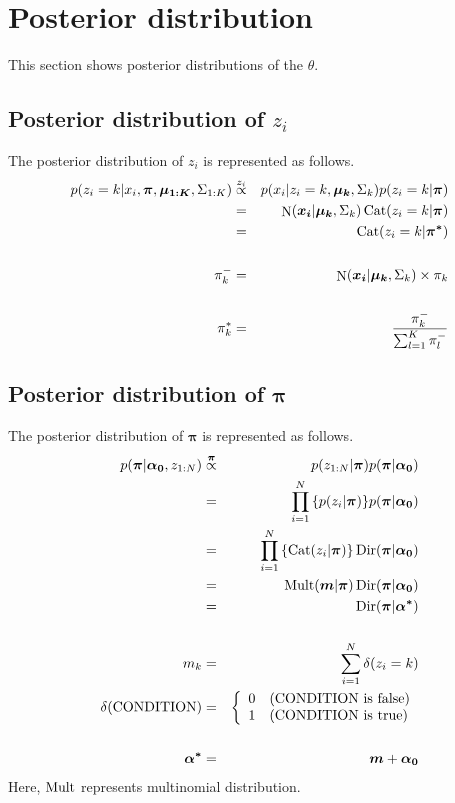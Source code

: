 \documentclass[a4paper]{article}
\DeclareMathOperator{\Cat}{\rm Cat}
\DeclareMathOperator{\Mult}{\rm Mult}
\DeclareMathOperator{\Dir}{\rm Dir}
\DeclareMathOperator{\N}{\rm N}
\newcommand{\proptoas}[1]{\overset{#1}{\propto}}
\begin{document}
\section{Posterior distribution}
This section shows posterior distributions of the $\theta$.

\subsection{Posterior distribution of $z_i$}
The posterior distribution of $z_i$ is represented as follows.
\begin{eqnarray}
	p(z_i = k | x_i, \boldsymbol{\pi}, \boldsymbol{\mu_{1:K}}, \Sigma_{1:K}) &\proptoas{z_i}& p(x_i | z_i = k, \boldsymbol{\mu_k}, \Sigma_k) p(z_i = k | \boldsymbol{\pi})\\
	&=& \N(\boldsymbol{x_i} | \boldsymbol{\mu_k}, \Sigma_k) \Cat(z_i = k | \boldsymbol{\pi})\\
	&=& \Cat(z_i = k | \boldsymbol{\pi^*})\\
	\nonumber \\
	\pi^{-}_{k} &=& \N(\boldsymbol{x_i} | \boldsymbol{\mu_k}, \Sigma_k) \times \pi_k \\
	\nonumber \\
	\pi^*_k &=& \frac{\pi^{-}_k}{\sum_{l = 1}^{K}{\pi^{-}_l}}
\end{eqnarray}

\subsection{Posterior distribution of $\boldsymbol{\pi}$}
The posterior distribution of $\boldsymbol{\pi}$ is represented as follows.
\begin{eqnarray}
	p(\boldsymbol{\pi} | \boldsymbol{\alpha_0}, z_{1:N}) &\proptoas{\boldsymbol{\pi}}& p(z_{1:N} | \boldsymbol{\pi}) p(\boldsymbol{\pi} | \boldsymbol{\alpha_0})\\
	&=& \prod_{i=1}^{N}{\left\{ p(z_i | \boldsymbol{\pi}) \right\} } p(\boldsymbol{\pi} | \boldsymbol{\alpha_0})\\
	&=& \prod_{i=1}^{N}{\left\{ \Cat(z_i | \boldsymbol{\pi}) \right\} } \Dir(\boldsymbol{\pi} | \boldsymbol{\alpha_0})\\
	&=& \Mult(\boldsymbol{m} | \boldsymbol{\pi}) \Dir(\boldsymbol{\pi} | \boldsymbol{\alpha_0})\\
	&=& \Dir(\boldsymbol{\pi} | \boldsymbol{\alpha^*})\\
	\nonumber \\
	m_k &=& \sum_{i=1}^{N}{\delta(z_i = k)}\\
	\delta(\text{CONDITION}) &=&
	\left\{
	\begin{array}{ll}
		0 & (\text{CONDITION is false})\\
		1 & (\text{CONDITION is true})
	\end{array}
	\right.\\
	\nonumber\\
	\boldsymbol{\alpha^*} &=& \boldsymbol{m} + \boldsymbol{\alpha_0}
\end{eqnarray}
Here, $\Mult$ represents multinomial distribution.
\end{document}
